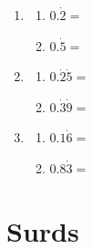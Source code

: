 \documentclass[a4paper,12pt]{article}
\begin{document}
\begin{tcolorbox}[colback=red!0!white, colframe=gray ,title=\subsubsection{Covert the recurring decimals to fractions and check your answer by using a calculator.}\label{Dec2}]
		\begin{multicols}{3}
\begin{enumerate}
\item 
\begin{enumerate}
	\item $0.\dot{2}=$
	\item $0.\dot{5}=$
\end{enumerate}
\item 
\begin{enumerate}
	\item $0.\dot{2}\dot{5}=$
	\item $0.\dot{3}\dot{9}=$
\end{enumerate}
\item 
\begin{enumerate}
	\item $0.1\dot{6}=$
	\item $0.8\dot{3}=$
\end{enumerate}
\end{enumerate}
	\end{multicols}
\end{tcolorbox}
\vspace{2cm}

\newpage

\section{Surds}
\end{document}
